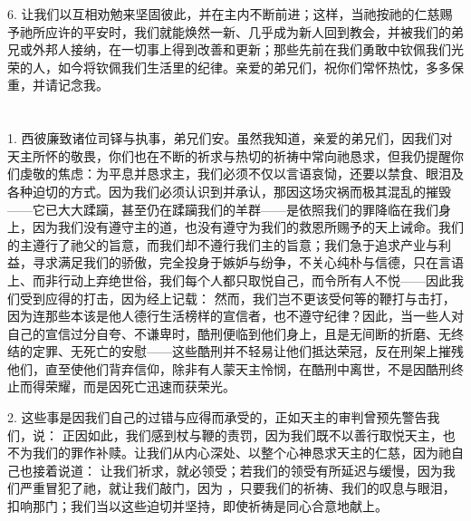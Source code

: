 6. 让我们以互相劝勉来坚固彼此，并在主内不断前进；这样，当祂按祂的仁慈赐予祂所应许的平安时，我们就能焕然一新、几乎成为新人回到教会，并被我们的弟兄或外邦人接纳，在一切事上得到改善和更新；那些先前在我们勇敢中钦佩我们光荣的人，如今将钦佩我们生活里的纪律。亲爱的弟兄们，祝你们常怀热忱，多多保重，并请记念我。\par



\section{}

\par

\par

1. 西彼廉致诸位司铎与执事，弟兄们安。虽然我知道，亲爱的弟兄们，因我们对天主所怀的敬畏，你们也在不断的祈求与热切的祈祷中常向祂恳求，但我仍提醒你们虔敬的焦虑：为平息并恳求主，我们必须不仅以言语哀恸，还要以禁食、眼泪及各种迫切的方式。因为我们必须认识到并承认，那因这场灾祸而极其混乱的摧毁——它已大大蹂躏，甚至仍在蹂躏我们的羊群——是依照我们的罪降临在我们身上，因为我们没有遵守主的道，也没有遵守为我们的救恩所赐予的天上诫命。我们的主遵行了祂父的旨意，而我们却不遵行我们主的旨意；我们急于追求产业与利益，寻求满足我们的骄傲，完全投身于嫉妒与纷争，不关心纯朴与信德，只在言语上、而非行动上弃绝世俗，我们每个人都只取悦自己，而令所有人不悦——因此我们受到应得的打击，因为经上记载：  然而，我们岂不更该受何等的鞭打与击打，因为连那些本该是他人德行生活榜样的宣信者，也不遵守纪律？因此，当一些人对自己的宣信过分自夸、不谦卑时，酷刑便临到他们身上，且是无间断的折磨、无终结的定罪、无死亡的安慰——这些酷刑并不轻易让他们抵达荣冠，反在刑架上摧残他们，直至使他们背弃信仰，除非有人蒙天主怜悯，在酷刑中离世，不是因酷刑终止而得荣耀，而是因死亡迅速而获荣光。\par

2. 这些事是因我们自己的过错与应得而承受的，正如天主的审判曾预先警告我们，说： 正因如此，我们感到杖与鞭的责罚，因为我们既不以善行取悦天主，也不为我们的罪作补赎。让我们从内心深处、以整个心神恳求天主的仁慈，因为祂自己也接着说道： 让我们祈求，就必领受；若我们的领受有所延迟与缓慢，因为我们严重冒犯了祂，就让我们敲门，因为 ，只要我们的祈祷、我们的叹息与眼泪，扣响那门；我们当以这些迫切并坚持，即使祈祷是同心合意地献上。\par

